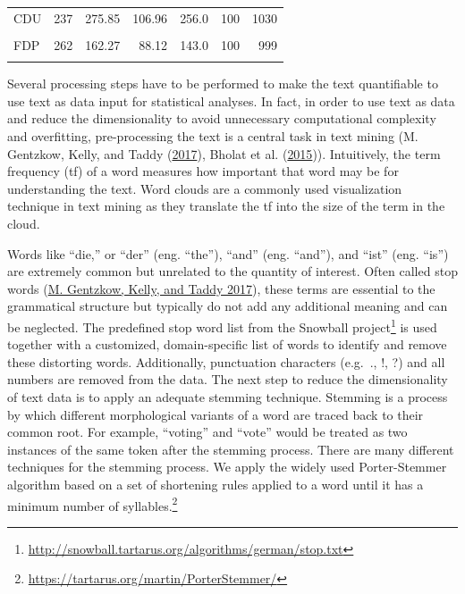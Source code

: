 \documentclass[
  12pt,
]{article}
\begin{document}
\begin{table}[H]
\begin{tabular}[t]{lrrrrrr}
\hspace{1em}CDU & 237 & 275.85 & 106.96 & 256.0 & 100 & 1030\\
\hspace{1em}\cellcolor{gray!6}{DIE LINKE} & \cellcolor{gray!6}{631} & \cellcolor{gray!6}{200.36} & \cellcolor{gray!6}{70.66} & \cellcolor{gray!6}{190.0} & \cellcolor{gray!6}{101} & \cellcolor{gray!6}{1048}\\
\hspace{1em}FDP & 262 & 162.27 & 88.12 & 143.0 & 100 & 999\\
\hspace{1em}\cellcolor{gray!6}{SPD} & \cellcolor{gray!6}{301} & \cellcolor{gray!6}{213.17} & \cellcolor{gray!6}{56.57} & \cellcolor{gray!6}{208.0} & \cellcolor{gray!6}{103} & \cellcolor{gray!6}{429}\\
\bottomrule
\end{tabular}
\end{table}

Several processing steps have to be performed to make the text
quantifiable to use text as data input for statistical analyses. In
fact, in order to use text as data and reduce the dimensionality to
avoid unnecessary computational complexity and overfitting,
pre-processing the text is a central task in text mining (M. Gentzkow,
Kelly, and Taddy (\protect\hyperlink{ref-gentzkow_text_2017}{2017}),
Bholat et al. (\protect\hyperlink{ref-bholat_text_2015}{2015})).
Intuitively, the term frequency (tf) of a word measures how important
that word may be for understanding the text. Word clouds are a commonly
used visualization technique in text mining as they translate the tf
into the size of the term in the cloud.

Words like ``die,'' or ``der'' (eng. ``the''), ``and'' (eng. ``and''),
and ``ist'' (eng. ``is'') are extremely common but unrelated to the
quantity of interest. Often called stop words
(\protect\hyperlink{ref-gentzkow_text_2017}{M. Gentzkow, Kelly, and
Taddy 2017}), these terms are essential to the grammatical structure but
typically do not add any additional meaning and can be neglected. The
predefined stop word list from the Snowball project\footnote{\url{http://snowball.tartarus.org/algorithms/german/stop.txt}}
is used together with a customized, domain-specific list of words to
identify and remove these distorting words. Additionally, punctuation
characters (e.g.~., !, ?) and all numbers are removed from the data. The
next step to reduce the dimensionality of text data is to apply an
adequate stemming technique. Stemming is a process by which different
morphological variants of a word are traced back to their common root.
For example, ``voting'' and ``vote'' would be treated as two instances
of the same token after the stemming process. There are many different
techniques for the stemming process. We apply the widely used
Porter-Stemmer algorithm based on a set of shortening rules applied to a
word until it has a minimum number of syllables.\footnote{\url{https://tartarus.org/martin/PorterStemmer/}}
\end{document}

